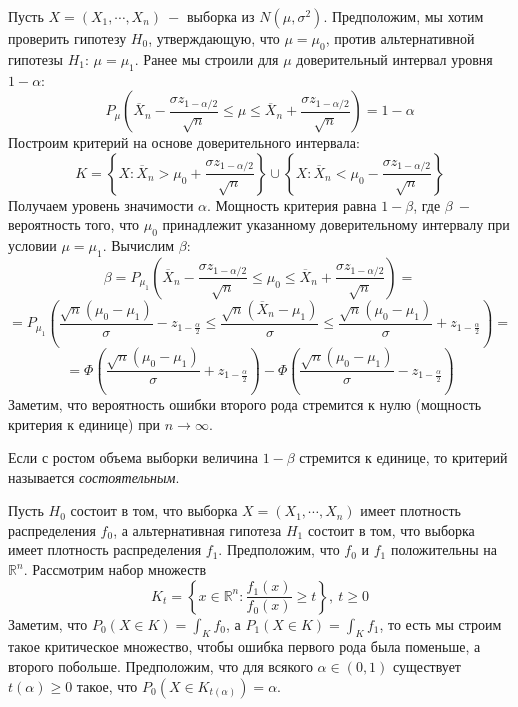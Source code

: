 \begin{example}
Пусть $X = \left(X_1, \cdots, X_n\right) \ -$ выборка из $N\left(\mu, \sigma ^ 2\right)$. Предположим, мы хотим проверить гипотезу $H_0$, утверждающую, что $\mu = \mu_0$, против альтернативной гипотезы $H_1$: $\mu = \mu_1$. Ранее мы строили для $\mu$ доверительный интервал уровня $1 - \alpha$:
\[
    P_\mu\left(\overline{X}_n - \frac{\sigma z_{1 - \alpha/2}}{\sqrt{n}} \leq \mu \leq \overline{X}_n + \frac{\sigma z_{1 - \alpha/2}}{\sqrt{n}}\right)  = 1 - \alpha
\]
Построим критерий на основе доверительного интервала:
\[
    K = \left\{X: \overline{X}_n > \mu_0 + \frac{\sigma z_{1 - \alpha/2}}{\sqrt{n}}\right\} \cup \left\{X: \overline{X}_n < \mu_0 - \frac{\sigma z_{1 - \alpha/2}}{\sqrt{n}}\right\}
\]
Получаем уровень значимости $\alpha$. Мощность критерия равна $1 - \beta$, где $\beta \ - $ вероятность того, что $\mu_0$ принадлежит указанному доверительному интервалу при условии $\mu = \mu_1$. Вычислим $\beta$:
\[
    \beta = P_{\mu_1}\left(\overline{X}_n - \frac{\sigma z_{1 - \alpha/2}}{\sqrt{n}} \leq \mu_0 \leq \overline{X}_n + \frac{\sigma z_{1 - \alpha/2}}{\sqrt{n}}\right) =\]\[= P_{\mu_1}\left(\frac{\sqrt{n}\left(\mu_0 - \mu_1\right)}{\sigma} - z_{1 - \frac \alpha 2} \leq \frac{\sqrt{n}\left(\overline{X}_n - \mu_1\right)}{\sigma} \leq \frac{\sqrt{n}\left(\mu_0 - \mu_1\right)}{\sigma} + z_{1 - \frac \alpha 2}\right) = 
\]\[
    = \Phi\left(\frac{\sqrt{n}\left(\mu_0 - \mu_1\right)}{\sigma} + z_{1 - \frac \alpha 2}\right) - \Phi\left(\frac{\sqrt{n}\left(\mu_0 - \mu_1\right)}{\sigma} - z_{1 - \frac \alpha 2}\right)
\]
Заметим, что вероятность ошибки второго рода стремится к нулю (мощность критерия к единице) при $n \to \infty$.
\par 
Если с ростом объема выборки величина $1 - \beta$ стремится к единице, то критерий называется \textit{состоятельным}.
\end{example}
\par
Пусть $H_0$ состоит в том, что выборка $X = \left(X_1, \cdots, X_n\right)$ имеет плотность распределения $f_0$, а альтернативная гипотеза $H_1$ состоит в том, что выборка имеет плотность распределения $f_1$. Предположим, что $f_0$ и $f_1$ положительны на $\mathbb{R} ^ n$. Рассмотрим набор множеств 
\[
    K_t  = \left\{x \in \mathbb{R} ^ n: \frac{f_1\left(x\right)}{f_0\left(x\right)}\geq t\right\}, \ t\geq 0
\]
Заметим, что $P_0 \left(X \in K\right) = \int_K f_0$, а $P_1\left(X \in K\right) = \int_K f_1$, то есть мы строим такое критическое множество, чтобы ошибка первого рода была поменьше, а второго побольше. Предположим, что для всякого $\alpha \in \left(0, 1\right)$ существует $t\left(\alpha\right) \geq 0$ такое, что $P_0\left(X \in K_{t\left(\alpha\right)}\right) = \alpha$.
